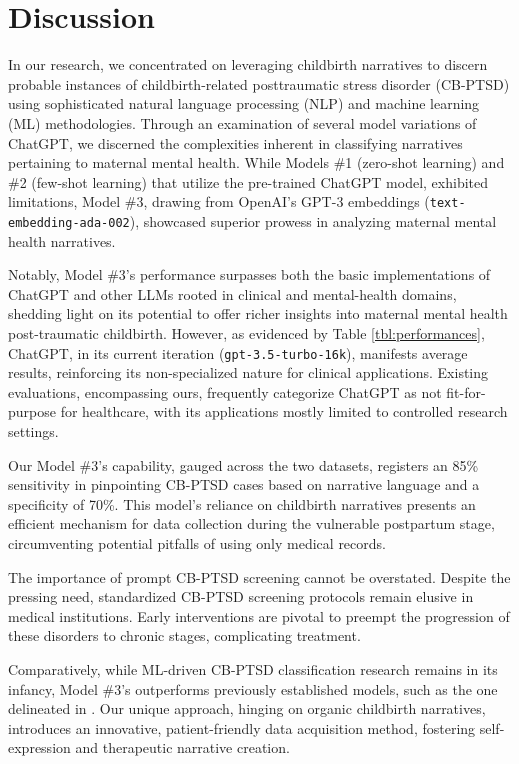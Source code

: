 \documentclass[bst/sn-nature]{sn-jnl}%
\theoremstyle{thmstyleone}%
\theoremstyle{thmstyletwo}%
\theoremstyle{thmstylethree}%
\begin{document}
\section{Discussion}
\label{sec:discussion}
In our research, we concentrated on leveraging childbirth narratives to discern probable instances of childbirth-related posttraumatic stress disorder (CB-PTSD) using sophisticated natural language processing (NLP) and machine learning (ML) methodologies. 
Through an examination of several model variations of ChatGPT, we discerned the complexities inherent in classifying narratives pertaining to maternal mental health.
While Models \#1 (zero-shot learning) and \#2 (few-shot learning) that utilize the pre-trained ChatGPT model, exhibited limitations, Model \#3, drawing from OpenAI's GPT-3 embeddings (\texttt{text-embedding-ada-002}), showcased superior prowess in analyzing maternal mental health narratives.

Notably, Model \#3's performance surpasses both the basic implementations of ChatGPT and other LLMs rooted in clinical and mental-health domains, shedding light on its potential to offer richer insights into maternal mental health post-traumatic childbirth. However, as evidenced by Table \ref{tbl:performances}, ChatGPT, in its current iteration (\texttt{gpt-3.5-turbo-16k}), manifests average results, reinforcing its non-specialized nature for clinical applications. 
Existing evaluations, encompassing ours, frequently categorize ChatGPT as not fit-for-purpose for healthcare, with its applications mostly limited to controlled research settings.

Our Model \#3's capability, gauged across the two datasets, registers an 85\% sensitivity in pinpointing CB-PTSD cases based on narrative language and a specificity of 70\%. 
This model's reliance on childbirth narratives presents an efficient mechanism for data collection during the vulnerable postpartum stage, circumventing potential pitfalls of using only medical records.

The importance of prompt CB-PTSD screening cannot be overstated.
Despite the pressing need, standardized CB-PTSD screening protocols remain elusive in medical institutions. 
Early interventions are pivotal to preempt the progression of these disorders to chronic stages, complicating treatment.

Comparatively, while ML-driven CB-PTSD classification research remains in its infancy, Model \#3's outperforms previously established models, such as the one delineated in \cite{bartal2023identifying}.
Our unique approach, hinging on organic childbirth narratives, introduces an innovative, patient-friendly data acquisition method, fostering self-expression and therapeutic narrative creation.
\end{document}
